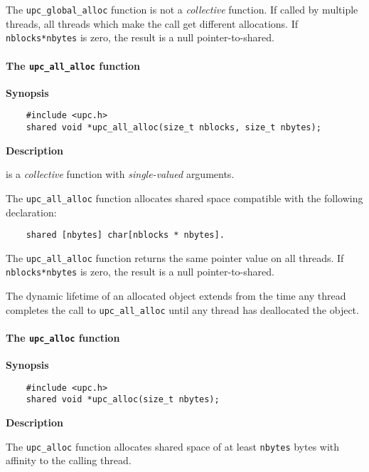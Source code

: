 \np The {\tt upc\_global\_alloc} function is not a {\em
    collective} function. If called by multiple threads,
    all threads which make the call get different allocations.
    If {\tt nblocks*nbytes} is zero, the result is a null pointer-to-shared.
    
\paragraph{The {\tt upc\_all\_alloc} function}

{\bf Synopsis} 

\npf\vspace{-2.5em}
\begin{verbatim}
    #include <upc.h> 
    shared void *upc_all_alloc(size_t nblocks, size_t nbytes); 
\end{verbatim}

{\bf Description}

 is a {\em collective} function with
    {\em single-valued} arguments.

\np The {\tt upc\_all\_alloc} function allocates  shared 
      space compatible with the following declaration:

\begin{verbatim}
    shared [nbytes] char[nblocks * nbytes].  
\end{verbatim}

\np The {\tt upc\_all\_alloc} function returns the same pointer
   value on all threads. 
   If {\tt nblocks*nbytes} is zero, the result is a null pointer-to-shared.
   
\np The dynamic lifetime of an allocated object extends from
   the time any thread completes the call to {\tt upc\_all\_alloc}
   until any thread has deallocated the object.

\paragraph{The {\tt upc\_alloc} function}

{\bf Synopsis} 

\npf\vspace{-2.5em}
\begin{verbatim}
    #include <upc.h> 
    shared void *upc_alloc(size_t nbytes); 
\end{verbatim}

{\bf Description}

\np The {\tt upc\_alloc} function allocates shared space of at
    least {\tt nbytes} bytes with affinity to the calling thread. 

